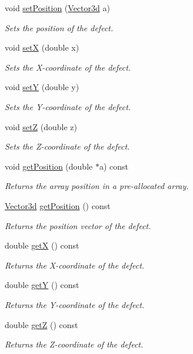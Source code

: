 \begin{DoxyCompactItemize}
void \hyperlink{classDefect_a36ffa9b4b01d38ed8a95ca2c78973cc4}{set\-Position} (\hyperlink{classVector3d}{\-Vector3d} a)
\begin{DoxyCompactList}\small\item\em \-Sets the position of the defect. \end{DoxyCompactList}\item 
void \hyperlink{classDefect_a5a65f73da6a572d9e7109b31239e441d}{set\-X} (double x)
\begin{DoxyCompactList}\small\item\em \-Sets the \-X-\/coordinate of the defect. \end{DoxyCompactList}\item 
void \hyperlink{classDefect_a268606391a4eaee3de029d2005648b6f}{set\-Y} (double y)
\begin{DoxyCompactList}\small\item\em \-Sets the \-Y-\/coordinate of the defect. \end{DoxyCompactList}\item 
void \hyperlink{classDefect_abb0b16c44a1b04d782f5c5f598b49d5b}{set\-Z} (double z)
\begin{DoxyCompactList}\small\item\em \-Sets the \-Z-\/coordinate of the defect. \end{DoxyCompactList}\item 
void \hyperlink{classDefect_a2bfcc6736a19eb9c4c8803ea0ea1e3f7}{get\-Position} (double $\ast$a) const 
\begin{DoxyCompactList}\small\item\em \-Returns the array position in a pre-\/allocated array. \end{DoxyCompactList}\item 
\hyperlink{classVector3d}{\-Vector3d} \hyperlink{classDefect_ad175c3f2b1fad6be48806dab69dfb32e}{get\-Position} () const 
\begin{DoxyCompactList}\small\item\em \-Returns the position vector of the defect. \end{DoxyCompactList}\item 
double \hyperlink{classDefect_a6e331ddeabd92e2edc124e6697d3bf7d}{get\-X} () const 
\begin{DoxyCompactList}\small\item\em \-Returns the \-X-\/coordinate of the defect. \end{DoxyCompactList}\item 
double \hyperlink{classDefect_ae307725c160984f44832fce5af896789}{get\-Y} () const 
\begin{DoxyCompactList}\small\item\em \-Returns the \-Y-\/coordinate of the defect. \end{DoxyCompactList}\item 
double \hyperlink{classDefect_a56e4a61e93d01dd765a921e3828af6c4}{get\-Z} () const 
\begin{DoxyCompactList}\small\item\em \-Returns the \-Z-\/coordinate of the defect. \end{DoxyCompactList}\end{DoxyCompactItemize}
